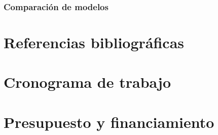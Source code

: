 \documentclass{article}
\theoremstyle{mytheoremstyle}
\theoremstyle{mytheoremstyle}
\theoremstyle{myproblemstyle}
\begin{document}
    \subsubsection{Comparación de modelos}
    

    \section{Referencias bibliográficas}
    \printbibliography

    \section{Cronograma de trabajo}

    \section{Presupuesto y financiamiento}
\end{document}
